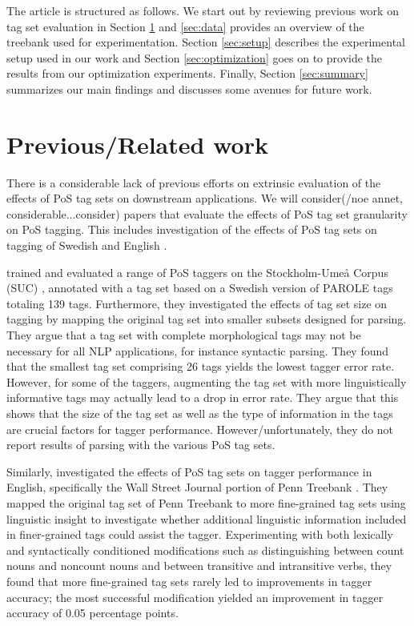 \documentclass[11pt,a4paper]{article}
\begin{document}
The article is structured as follows. We start out by reviewing
previous work on tag set evaluation in Section \ref{sec:prev} and
\ref{sec:data} provides an overview of the treebank used for
experimentation. Section \ref{sec:setup} describes the experimental
setup used in our work and Section \ref{sec:optimization} goes on to
provide the results from our optimization experiments. Finally,
Section \ref{sec:summary} summarizes our main findings and discusses
some avenues for future work.

\section{Previous/Related work}
\label{sec:prev}
There is a considerable lack of previous efforts on extrinsic evaluation of the
effects of PoS tag sets on downstream applications. We will consider(/noe
annet, considerable...consider) papers that evaluate the effects of PoS tag
set granularity on PoS tagging. This includes investigation of the effects of
PoS tag sets on tagging of Swedish \cite{Meg:01,Meg:02} and English
\cite{Mac:05}.


\cite{Meg:01,Meg:02} trained and evaluated a range of PoS taggers on the
Stockholm-Umeå Corpus (SUC) \cite{Gus:Har:06}, annotated with a tag set based
on a Swedish version of PAROLE tags totaling 139 tags. Furthermore, they
investigated the effects of tag set size on tagging by mapping the original tag
set into smaller subsets designed for parsing. They argue that a tag set with
complete morphological tags may not be necessary for all NLP applications, for
instance syntactic parsing. They found that the smallest tag set comprising 26
tags yields the lowest tagger error rate. However, for some of the taggers,
augmenting the tag set with more linguistically informative tags may actually
lead to a drop in error rate. They argue that this shows that the size of the
tag set as well as the type of information in the tags are crucial factors for
tagger performance. However/unfortunately, they do not report results of
parsing with the various PoS tag sets.

Similarly,  investigated the effects of PoS tag sets on tagger
performance in English, specifically the Wall Street Journal portion of Penn
Treebank \cite{Mar:San:Mar:93}. They mapped the original tag set of Penn
Treebank to more fine-grained tag sets using linguistic insight to investigate
whether additional linguistic information included in finer-grained tags could
assist the tagger. Experimenting with both lexically and syntactically
conditioned modifications such as distinguishing between count nouns and
noncount nouns and between transitive and intransitive verbs, they found that
more fine-grained tag sets rarely led to improvements in tagger accuracy; the
most successful modification yielded an improvement in tagger accuracy of 0.05
percentage points.
\end{document}
